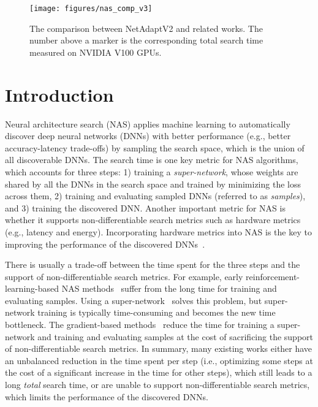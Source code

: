 \begin{figure}[t]
\begin{center}
   \texttt{[image: figures/nas\_comp\_v3]}
\end{center}
   \vspace{-4mm}
   \caption{The comparison between NetAdaptV2 and related works. The number above a marker is the corresponding total search time measured on NVIDIA V100 GPUs.}
\label{fig:nas_comparison}
\end{figure}

\section{Introduction}
\label{sec:introduction}

Neural architecture search (NAS) applies machine learning to automatically discover deep neural networks (DNNs) with better performance (e.g., better accuracy-latency trade-offs) by sampling the search space, which is the union of all discoverable DNNs. The search time is one key metric for NAS algorithms, which accounts for three steps: 1) training a \emph{super-network}, whose weights are shared by all the DNNs in the search space and trained by minimizing the loss across them, 2) training and evaluating sampled DNNs (referred to as \emph{samples}), and 3) training the discovered DNN. Another important metric for NAS is whether it supports non-differentiable search metrics such as hardware metrics (e.g., latency and energy). Incorporating hardware metrics into NAS is the key to improving the performance of the discovered DNNs~\cite{eccv2018-netadapt, Tan2018MnasNetPN, cai2018proxylessnas, Chen2020MnasFPNLL, chamnet}.


There is usually a trade-off between the time spent for the three steps and the support of non-differentiable search metrics. For example, early reinforcement-learning-based NAS methods~\cite{zoph2017nasreinforcement, zoph2018nasnet, Tan2018MnasNetPN} suffer from the long time for training and evaluating samples. Using a super-network~\cite{yu2018slimmable, Yu_2019_ICCV, autoslim_arxiv, cai2020once, yu2020bignas, Bender2018UnderstandingAS, enas, tunas, Guo2020SPOS} solves this problem, but super-network training is typically time-consuming and becomes the new time bottleneck. The gradient-based methods~\cite{gordon2018morphnet, liu2018darts, wu2018fbnet, fbnetv2, cai2018proxylessnas, stamoulis2019singlepath, stamoulis2019singlepathautoml, Mei2020AtomNAS, Xu2020PC-DARTS} reduce the time for training a super-network and training and evaluating samples at the cost of sacrificing the support of non-differentiable search metrics. In summary, many existing works either have an unbalanced reduction in the time spent per step (i.e., optimizing some steps at the cost of a significant increase in the time for other steps), which still leads to a long \emph{total} search time, or are unable to support non-differentiable search metrics, which limits the performance of the discovered DNNs.

